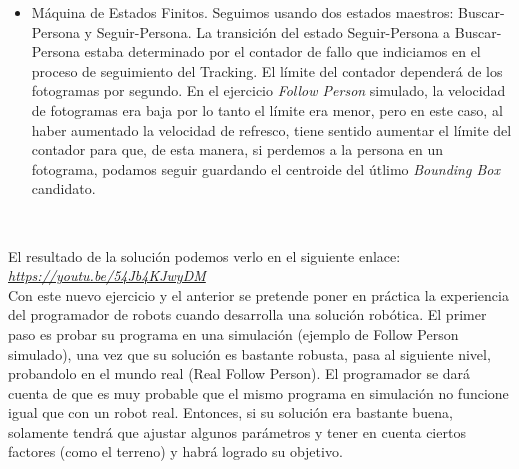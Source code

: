 \begin{itemize}
	\item Máquina de Estados Finitos. Seguimos usando dos estados maestros: Buscar-Persona y Seguir-Persona. La transición del estado Seguir-Persona a Buscar-Persona estaba determinado por el contador de fallo que indiciamos en el proceso de seguimiento del Tracking. El límite del contador dependerá de los fotogramas por segundo. En el ejercicio \textit{Follow Person} simulado, la velocidad de fotogramas era baja por lo tanto el límite era menor, pero en este caso, al haber aumentado la velocidad de refresco, tiene sentido aumentar el límite del contador para que, de esta manera, si perdemos a la persona en un fotograma, podamos seguir guardando el centroide del útlimo \textit{Bounding Box} candidato.
\end{itemize}\

El resultado de la solución podemos verlo en el siguiente enlace:\\
\textit{\url{https://youtu.be/54Jb4KJwyDM}}\\

Con este nuevo ejercicio y el anterior se pretende poner en práctica la experiencia del programador de robots cuando desarrolla una solución robótica. El primer paso es probar su programa en una simulación (ejemplo de Follow Person simulado), una vez que su solución es bastante robusta, pasa al siguiente nivel, probandolo en el mundo real (Real Follow Person). El programador se dará cuenta de que es muy probable que el mismo programa en simulación no funcione igual que con un robot real. Entonces, si su solución era bastante buena, solamente tendrá que ajustar algunos parámetros y tener en cuenta ciertos factores (como el terreno) y habrá logrado su objetivo.\\